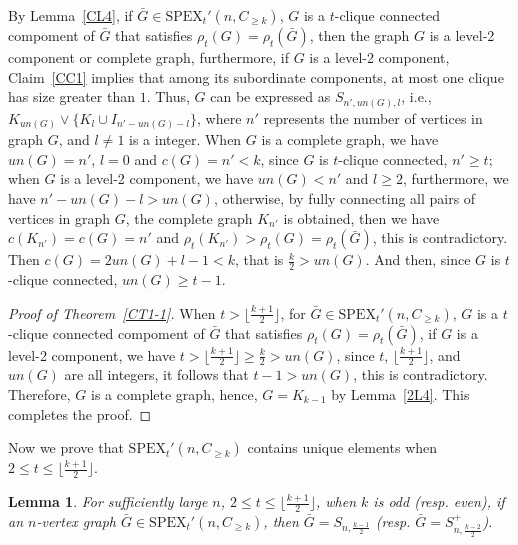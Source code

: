 \documentclass[preprint,12pt]{elsarticle}
\newtheorem{lem}[thm]{Lemma}
\begin{document}
            By Lemma~\ref{CL4}, if $\bar{G} \in \mathrm{SPEX}_t'(n, C_{\geq k})$, $G $ is a $t$-clique connected compoment of $\bar{G} $ that satisfies $\rho_t(G) = \rho_t(\bar{G})$, then the graph $G$ is a level-2 component or complete graph, furthermore, if $G$ is a level-2 component,  Claim~\ref{CC1} implies that among its subordinate components, at most one clique has size greater than $1$. Thus, $G$ can be expressed as $S_{n',un(G),l}$, i.e., $K_{un(G)} \vee \{K_l \cup I_{n'-un(G)-l}\}$, where $n'$ represents the number of vertices in graph $G$, and $l \neq 1$ is a integer. When $G $ is a complete graph, we have $un(G)=n'$, $l = 0$ and $c(G) = n' < k$, since $G$ is $t$-clique connected, $n' \geq t$;
            when $G $ is a level-2 component, we have $un(G) < n'$ and $l \geq 2$, furthermore, we have $n'-un(G)-l > un(G)$, otherwise, by fully connecting all pairs of vertices in graph $G$, the complete graph $K_{n'} $ is obtained, then we have $c(K_{n'}) = c(G) = n'$ and $\rho_t(K_{n'}) > \rho_t(G) = \rho_t(\bar{G}) $, this is contradictory.
            Then $c(G) = 2un(G) + l - 1 < k$, that is $\frac{k}{2} > {un}(G)$. And then, since $G$ is $t$-clique connected, $un(G) \geq t-1$.



            \begin{proof}[Proof of Theorem~\ref{CT1-1}]
            When $ t > \lfloor \frac{k+1}{2} \rfloor $, for $\bar{G} \in \mathrm{SPEX}_t'(n, C_{\geq k})$, $G $ is a $t$-clique connected compoment of $\bar{G} $ that satisfies $\rho_t(G) = \rho_t(\bar{G})$, if $G $ is a level-2 component, we have $ t > \lfloor \frac{k+1}{2} \rfloor \geq \frac{k}{2} > {un}(G) $, since $ t $, $ \lfloor \frac{k+1}{2} \rfloor $, and $ {un}(G) $ are all integers, it follows that $ t-1 > {un}(G) $, this is contradictory. Therefore, $ G $ is a complete graph, hence, $ G = K_{k-1} $ by Lemma~\ref{2L4}.
            This completes the proof.
            \end{proof}



             Now we prove that $\mathrm{SPEX}_t'(n,C_{\geq k}) $ contains unique elements when $2 \leq t \leq \lfloor \frac{k+1}{2} \rfloor$.








        \begin{lem}\label{CL5}
            For sufficiently large $n$, $2 \leq t \leq \lfloor \frac{k+1}{2} \rfloor$, when $k $ is odd (resp. even), if an $n$-vertex graph $\bar{G} \in \mathrm{SPEX}_t'(n,C_{\geq k}) $, then $\bar{G} = S_{n, \frac{k-1}{2} }$ (resp. $\bar{G} = S_{n, \frac{k-2}{2} }^+$).
        \end{lem}
\end{document}
